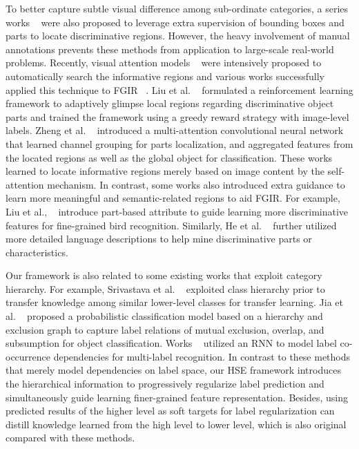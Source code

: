 \documentclass[sigconf]{acmart}
\begin{document}
To better capture subtle visual difference among sub-ordinate categories, a series works ~\cite{zhang2014part,huang2016part,zhang2016spda} were also proposed to leverage extra supervision of bounding boxes and parts to locate discriminative regions. However, the heavy involvement of manual annotations prevents these methods from application to large-scale real-world problems. Recently, visual attention models ~\cite{mnih2014recurrent,chen2018recurrent,wang2017multi,liu2018crowd} were intensively proposed to automatically search the informative regions and various works successfully applied this technique to FGIR ~\cite{liu2016fully,fu2017look,zheng2017learning,jaderberg2015spatial}. Liu et al. ~\cite{liu2016fully} formulated a reinforcement learning framework to adaptively glimpse local regions regarding discriminative object parts and trained the framework using a greedy reward strategy with image-level labels. Zheng et al. ~\cite{zheng2017learning} introduced a multi-attention convolutional neural network that learned channel grouping for parts localization, and aggregated features from the located regions as well as the global object for classification. These works learned to locate informative regions merely based on image content by the self-attention mechanism. In contrast, some works also introduced extra guidance to learn more meaningful and semantic-related regions to aid FGIR. For example, Liu et al., ~\cite{liu2017localizing,chen2018knowledge} introduce part-based attribute to guide learning more discriminative features for fine-grained bird recognition. Similarly, He et al. ~\cite{he2017fine} further utilized more detailed language descriptions to help mine discriminative parts or characteristics.

Our framework is also related to some existing works that exploit category hierarchy. For example, Srivastava et al. ~\cite{srivastava2013discriminative} exploited class hierarchy prior to transfer knowledge among similar lower-level classes for transfer learning. Jia et al. ~\cite{deng2014large} proposed a probabilistic classification model based on a hierarchy and exclusion graph to capture label relations of mutual exclusion, overlap, and subsumption for object classification. Works ~\cite{wang2016cnn,chen2018recurrent} utilized an RNN to model label co-occurrence dependencies for multi-label recognition. In contrast to these methods that merely model dependencies on label space, our HSE framework introduces the hierarchical information to progressively regularize label prediction and simultaneously guide learning finer-grained feature representation. Besides, using predicted results of the higher level as soft targets for label regularization can distill knowledge learned from the high level to lower level, which is also original compared with these methods.
\end{document}
